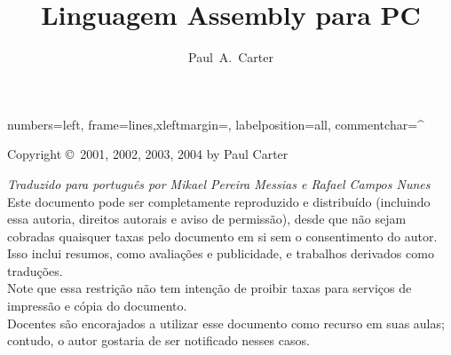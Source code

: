 \documentclass[11pt]{book}
\author{Paul~A.~Carter}
\title{Linguagem Assembly para PC}
\newif\ifmypdf
\begin{document}
\maketitle
\newlength{\AsmMargin}
\setlength{\AsmMargin}{-1cm}
{numbers=left, frame=lines,xleftmargin=\AsmMargin, labelposition=all, commentchar=^ }

\newcommand{\MarginNote}[1]{\marginpar{\sloppy \em \small #1}}
\thispagestyle{empty}
\vspace*{\fill}
\noindent Copyright \copyright\  2001, 2002, 2003, 2004 by Paul Carter

\noindent \emph{Traduzido para português por Mikael Pereira Messias
  e Rafael Campos Nunes}\\

\noindent Este documento pode ser completamente reproduzido e distribuído
(incluindo essa autoria, direitos autorais e aviso de permissão),
desde que não sejam cobradas quaisquer taxas pelo documento em si sem
o consentimento do autor. Isso inclui resumos, como avaliações e
publicidade, e trabalhos derivados como traduções. \\

\noindent \noindent Note que essa restrição não tem intenção de proibir
taxas para serviços de impressão e cópia do documento.\\

\noindent Docentes são encorajados a utilizar esse documento como recurso
em suas aulas; contudo, o autor gostaria de ser notificado nesses casos.\\


\vfill
\frontmatter


\mainmatter







% 
\begin{appendix}

\end{appendix}
\clearpage
\ifmypdf
\phantomsection %
\fi
{}
\printindex
\end{document}
